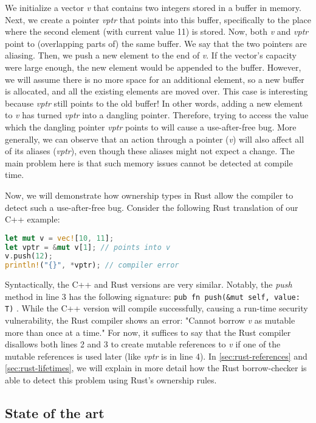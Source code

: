 \documentclass[sigplan,11pt,nonacm]{acmart}
\begin{document}
We initialize a vector \emph{v} that contains two integers stored in a buffer in memory.
Next, we create a pointer \emph{vptr} that points into this buffer, specifically to the place where the second element (with current value 11) is stored.
Now, both \emph{v} and \emph{vptr} point to (overlapping parts of) the same buffer.
We say that the two pointers are aliasing.
Then, we push a new element to the end of \emph{v}.
If the vector's capacity were large enough, the new element would be appended to the buffer.
However, we will assume there is no more space for an additional element, so a new buffer is allocated, and all the existing elements are moved over.
This case is interesting because \emph{vptr} still points to the old buffer!
In other words, adding a new element to \emph{v} has turned \emph{vptr} into a dangling pointer.
Therefore, trying to access the value which the dangling pointer \emph{vptr} points to will cause a use-after-free bug.
More generally, we can observe that an action through a pointer (\emph{v}) will also affect all of its aliases (\emph{vptr}), even though these aliases might not expect a change.
The main problem here is that such memory issues cannot be detected at compile time.

Now, we will demonstrate how ownership types in Rust allow the compiler to detect such a use-after-free bug.
Consider the following Rust translation of our C++ example:

\begin{lstlisting}[language=Rust]
let mut v = vec![10, 11];
let vptr = &mut v[1]; // points into v
v.push(12);
println!("{}", *vptr); // compiler error
\end{lstlisting}

Syntactically, the C++ and Rust versions are very similar.
Notably, the \emph{push} method in line 3 has the following signature: \verb|pub fn push(&mut self, value: T)| \cite{rust-vector-documentation}.
While the C++ version will compile successfully, causing a run-time security vulnerability, the Rust compiler shows an error: "Cannot borrow \emph{v} as mutable more than once at a time."
For now, it suffices to say that the Rust compiler disallows both lines 2 and 3 to create mutable references to \emph{v} if one of the mutable references is used later (like \emph{vptr} is in line 4).
In \ref{sec:rust-references} and \ref{sec:rust-lifetimes}, we will explain in more detail how the Rust borrow-checker is able to detect this problem using Rust's ownership rules.


\subsection{State of the art}
\label{sec:state-of-the-art}
\end{document}
